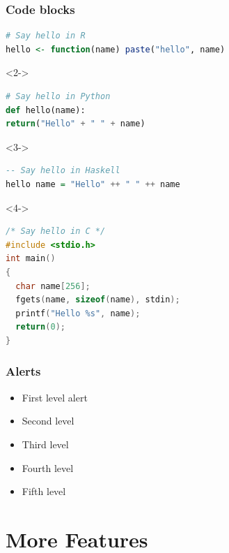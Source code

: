 \documentclass[11pt]{beamer}
\begin{document}
\begin{frame}[fragile]
  \frametitle{Code blocks}

\begin{lstlisting}[language=R]
# Say hello in R
hello <- function(name) paste("hello", name)
\end{lstlisting}

\begin{uncoverenv}<2->
\begin{lstlisting}[language=Python]
# Say hello in Python
def hello(name):
return("Hello" + " " + name)
\end{lstlisting}
\end{uncoverenv}

\begin{uncoverenv}<3->
\begin{lstlisting}[language=Haskell]
-- Say hello in Haskell
hello name = "Hello" ++ " " ++ name
\end{lstlisting}
\end{uncoverenv}


\begin{uncoverenv}<4->
\begin{lstlisting}[language=C]
/* Say hello in C */
#include <stdio.h>
int main()
{
  char name[256];
  fgets(name, sizeof(name), stdin);
  printf("Hello %s", name);
  return(0);
}
\end{lstlisting}
\end{uncoverenv}

\end{frame}

\begin{frame}
  \frametitle{Alerts}
  \begin{itemize}
     \item First level \alert{alert}
     \item Second level 
     \item Third level 
     \item Fourth level 
     \item Fifth level 
  \end{itemize}

\end{frame}

\section{More Features}
\end{document}
